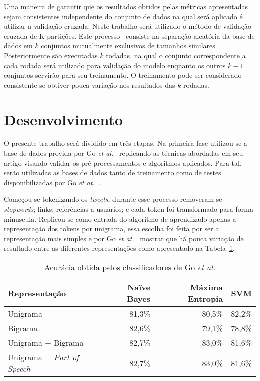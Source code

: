 Uma maneira de garantir que os resultados obtidos pelas métricas apresentadas sejam consistentes independente do
conjunto de dados na qual será aplicado é utilizar a validação cruzada.
Neste trabalho será utilizado o método de validação cruzada de K-partições.
Este processo~\cite{kohavi95} consiste na separação aleatória da base de dados em $k$ conjuntos mutualmente exclusivos
de tamanhos similares.
Posteriormente são executadas $k$ rodadas, na qual o conjunto correspondente a cada rodada será utilizado para validação
do modelo enquanto os outros $k-1$ conjuntos servirão para seu treinamento.
O treinamento pode ser considerado consistente se obtiver pouca variação nos resultados das $k$ rodadas.

\section{Desenvolvimento} \label{sec:desenvolvimento}

O presente trabalho será dividido em três etapas.
Na primeira fase utilizou-se a base de dados provida por Go \textit{et al.}~\cite{go09} replicando as técnicas
abordadas em seu artigo visando validar os pré-processamentos e algoritmos aplicados.
Para tal, serão utilizadas as bases de dados tanto de treinamento como de testes disponibilizadas por Go
\textit{et at.}~\cite{go09}.

Começou-se tokenizando os \textit{tweets}, durante esse processo removeram-se \textit{stopwords}; links; referências a usuários;
e cada token foi transformado para forma minuscula.
Replicou-se como entrada do algoritmo de aprendizado apenas a representação dos tokens por unigrama, essa escolha foi
feita por ser a representação mais simples e por Go \textit{et at.}~\cite{go09} mostrar que há pouca variação de
resultado entre as diferentes representações como apresentado na Tabela~\ref{tab:go}.

\begin{table}[h]
    \begin{center}
        \begin{tabular}{| l | r | r | r |}
        \hline
        \textbf{Representação} & \textbf{Naïve Bayes} & \textbf{Máxima Entropia} & \textbf{SVM} \\ \hline
        Unigrama & 81,3\% & 80,5\% & 82,2\% \\ \hline
        Bigrama &  82,6\% & 79,1\% & 78,8\% \\ \hline
        Unigrama + Bigrama & 82,7\% & 83,0\% & 81,6\% \\ \hline
        Unigrama + \textit{Part of Speech} & 82,7\% & 83,0\% & 81,6\% \\ \hline
        \end{tabular}
        \caption{Acurácia obtida pelos classificadores de Go \textit{et al.}}
        \label{tab:go}
    \end{center}
\end{table}

